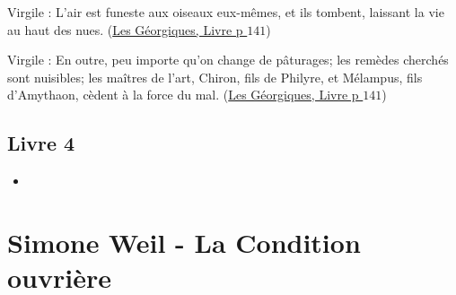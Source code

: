 \documentclass[a4paper, 11pt, hidelinks]{article}
\newcommand{\bs}{\bigskip}
\newcommand{\rb}[1]{\Romanbar{#1}}
\newcommand{\citer}[3]{\bs \begin{center} \textcolor{authorGray}{#1 :} \textcolor{citationRed}{\og #2 \fg} \textcolor{authorGray}{(\underline{#3})} \end{center} \bs}
\begin{document}
\citer{Virgile}{L'air est funeste aux oiseaux eux-mêmes, et ils tombent, laissant la vie au haut des nues.}{Les Géorgiques, Livre \rb{3} p $141$}


\citer{Virgile}{En outre, peu importe qu'on change de pâturages; les remèdes cherchés sont nuisibles; les maîtres de l'art, Chiron,
fils de Philyre, et Mélampus, fils d'Amythaon, cèdent à la force du mal.}{Les Géorgiques, Livre \rb{3} p $141$}





\subsection{Livre 4}


\begin{itemize}
    \item 
\end{itemize}


\section{Simone Weil - La Condition ouvrière}
\end{document}
